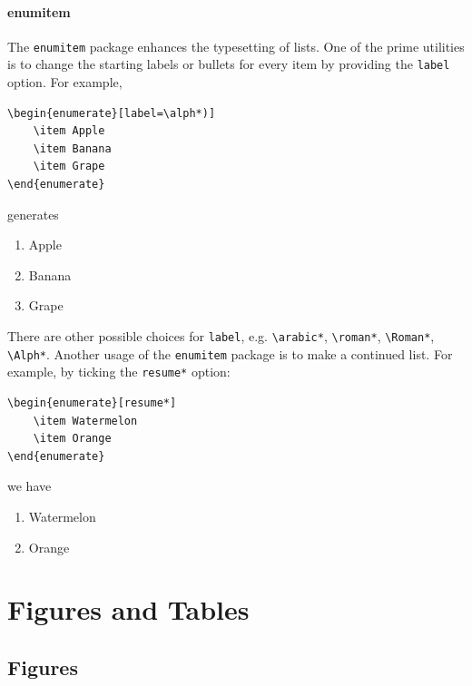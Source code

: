 \paragraph{enumitem}
The \verb|enumitem| package enhances the typesetting of lists. One of the prime utilities is to change the starting labels or bullets for every item by providing the \verb|label| option. For example,
\begin{lstlisting}
\begin{enumerate}[label=\alph*)]
    \item Apple
    \item Banana
    \item Grape
\end{enumerate}
\end{lstlisting}
generates
\begin{enumerate}[label=\alph*)]
    \item Apple
    \item Banana
    \item Grape
\end{enumerate}
There are other possible choices for \verb|label|, e.g. \texttt{\textbackslash arabic*}, \texttt{\textbackslash roman*}, \texttt{\textbackslash Roman*}, \texttt{\textbackslash Alph*}. Another usage of the \verb|enumitem| package is to make a continued list. For example, by ticking the \verb|resume*| option:
\begin{lstlisting}
\begin{enumerate}[resume*]
    \item Watermelon
    \item Orange
\end{enumerate}    
\end{lstlisting}
we have
\begin{enumerate}[resume*]
    \item Watermelon
    \item Orange
\end{enumerate}

\section{Figures and Tables}

\subsection{Figures}

